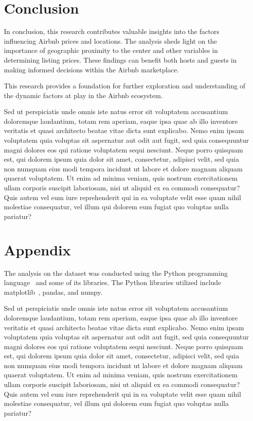 \documentclass[10pt, conference, compsocconf]{IEEEtran}
\begin{document}
\section{Conclusion}
In conclusion, this research contributes valuable insights into the factors influencing Airbnb prices and locations. 
The analysis sheds light on the importance of geographic proximity to the center and other variables in determining listing prices. 
These findings can benefit both hosts and guests in making informed decisions within the Airbnb marketplace.

This research provides a foundation for further exploration and understanding of the dynamic factors at play in the Airbnb ecosystem.

Sed ut perspiciatis unde omnis iste natus error sit voluptatem accusantium doloremque laudantium, totam rem aperiam, eaque ipsa quae ab illo inventore veritatis et quasi architecto beatae vitae dicta sunt explicabo. 
Nemo enim ipsam voluptatem quia voluptas sit aspernatur aut odit aut fugit, sed quia consequuntur magni dolores eos qui ratione voluptatem sequi nesciunt. Neque porro quisquam est, qui dolorem ipsum quia dolor sit amet, consectetur, adipisci velit, sed quia non numquam eius modi tempora incidunt ut labore et dolore magnam aliquam quaerat voluptatem. 
Ut enim ad minima veniam, quis nostrum exercitationem ullam corporis suscipit laboriosam, nisi ut aliquid ex ea commodi consequatur? Quis autem vel eum iure reprehenderit qui in ea voluptate velit esse quam nihil molestiae consequatur, vel illum qui dolorem eum fugiat quo voluptas nulla pariatur?


\section{Appendix}

The analysis on the dataset was conducted using the Python programming language~\cite{rayhanrise, van1995python} and some of its libraries. 
The Python libraries utilized include matplotlib~\cite{Hunter:2007}, pandas, and numpy.


Sed ut perspiciatis unde omnis iste natus error sit voluptatem accusantium doloremque laudantium, totam rem aperiam, eaque ipsa quae ab illo inventore veritatis et quasi architecto beatae vitae dicta sunt explicabo. 
Nemo enim ipsam voluptatem quia voluptas sit aspernatur aut odit aut fugit, sed quia consequuntur magni dolores eos qui ratione voluptatem sequi nesciunt. Neque porro quisquam est, qui dolorem ipsum quia dolor sit amet, consectetur, adipisci velit, sed quia non numquam eius modi tempora incidunt ut labore et dolore magnam aliquam quaerat voluptatem. 
Ut enim ad minima veniam, quis nostrum exercitationem ullam corporis suscipit laboriosam, nisi ut aliquid ex ea commodi consequatur? Quis autem vel eum iure reprehenderit qui in ea voluptate velit esse quam nihil molestiae consequatur, vel illum qui dolorem eum fugiat quo voluptas nulla pariatur?
\end{document}
